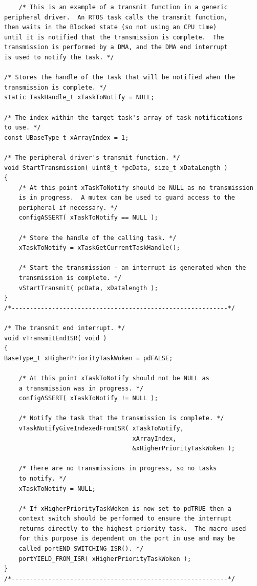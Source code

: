 \begin{verbatim}
    /* This is an example of a transmit function in a generic
peripheral driver.  An RTOS task calls the transmit function,
then waits in the Blocked state (so not using an CPU time)
until it is notified that the transmission is complete.  The
transmission is performed by a DMA, and the DMA end interrupt
is used to notify the task. */

/* Stores the handle of the task that will be notified when the
transmission is complete. */
static TaskHandle_t xTaskToNotify = NULL;

/* The index within the target task's array of task notifications
to use. */
const UBaseType_t xArrayIndex = 1;

/* The peripheral driver's transmit function. */
void StartTransmission( uint8_t *pcData, size_t xDataLength )
{
    /* At this point xTaskToNotify should be NULL as no transmission
    is in progress.  A mutex can be used to guard access to the
    peripheral if necessary. */
    configASSERT( xTaskToNotify == NULL );

    /* Store the handle of the calling task. */
    xTaskToNotify = xTaskGetCurrentTaskHandle();

    /* Start the transmission - an interrupt is generated when the
    transmission is complete. */
    vStartTransmit( pcData, xDatalength );
}
/*-----------------------------------------------------------*/

/* The transmit end interrupt. */
void vTransmitEndISR( void )
{
BaseType_t xHigherPriorityTaskWoken = pdFALSE;

    /* At this point xTaskToNotify should not be NULL as
    a transmission was in progress. */
    configASSERT( xTaskToNotify != NULL );

    /* Notify the task that the transmission is complete. */
    vTaskNotifyGiveIndexedFromISR( xTaskToNotify,
                                   xArrayIndex,
                                   &xHigherPriorityTaskWoken );

    /* There are no transmissions in progress, so no tasks
    to notify. */
    xTaskToNotify = NULL;

    /* If xHigherPriorityTaskWoken is now set to pdTRUE then a
    context switch should be performed to ensure the interrupt
    returns directly to the highest priority task.  The macro used
    for this purpose is dependent on the port in use and may be
    called portEND_SWITCHING_ISR(). */
    portYIELD_FROM_ISR( xHigherPriorityTaskWoken );
}
/*-----------------------------------------------------------*/


\end{verbatim}
